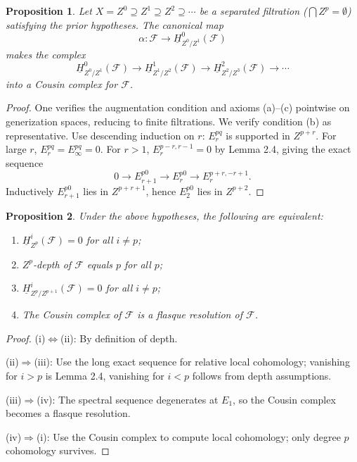 \documentclass[12pt]{book}
\newcommand{\sheaf}[1]{\mathcal{#1}}
\theoremstyle{plain}
\newtheorem{proposition}{Proposition}[section]
\begin{document}
\setcounter{page}{236}
\begin{proposition}
Let \(X=Z^0\supseteq Z^1\supseteq Z^2\supseteq\cdots\) be a separated filtration (\(\bigcap Z^p=\emptyset\)) satisfying the prior hypotheses. The canonical map
\[
\alpha\colon \sheaf{F} \to \underline{H}_{Z^0/Z^1}^0(\sheaf{F})
\]
makes the complex
\[
\underline{H}_{Z^0/Z^1}^0(\sheaf{F})
\to \underline{H}_{Z^1/Z^2}^1(\sheaf{F})
\to \underline{H}_{Z^2/Z^3}^2(\sheaf{F})
\to\cdots
\]
into a Cousin complex for \(\sheaf{F}\).
\end{proposition}

\begin{proof}
One verifies the augmentation condition and axioms (a)--(c) pointwise on generization spaces, reducing to finite filtrations. We verify condition (b) as representative. Use descending induction on \(r\): \(E_r^{pq}\) is supported in \(Z^{p+r}\). For large \(r\), \(E_r^{pq}=E_\infty^{pq}=0\). For \(r>1\), \(E_r^{p-r,r-1}=0\) by Lemma 2.4, giving the exact sequence
\[
0\to E_{r+1}^{p0}\to E_r^{p0}\to E_r^{p+r,-r+1}.
\]
Inductively \(E_{r+1}^{p0}\) lies in \(Z^{p+r+1}\), hence \(E_2^{p0}\) lies in \(Z^{p+2}\).

\setcounter{page}{237}
\end{proof}

\begin{proposition}
Under the above hypotheses, the following are equivalent:
\begin{enumerate}
\item[\textup{(i)}] \(\underline{H}_{Z^p}^i(\sheaf{F})=0\) for all \(i\ne p\);
\item[\textup{(ii)}] \(Z^p\)-depth of \(\sheaf{F}\) equals \(p\) for all \(p\);
\item[\textup{(iii)}] \(\underline{H}_{Z^p/Z^{p+1}}^i(\sheaf{F})=0\) for all \(i\ne p\);
\item[\textup{(iv)}] The Cousin complex of \(\sheaf{F}\) is a flasque resolution of \(\sheaf{F}\).
\end{enumerate}
\end{proposition}

\begin{proof}
(i)\(\Leftrightarrow\)(ii): By definition of depth.

(ii)\(\Rightarrow\)(iii): Use the long exact sequence for relative local cohomology; vanishing for \(i>p\) is Lemma 2.4, vanishing for \(i<p\) follows from depth assumptions.

\setcounter{page}{238}
(iii)\(\Rightarrow\)(iv): The spectral sequence degenerates at \(E_1\), so the Cousin complex becomes a flasque resolution.

(iv)\(\Rightarrow\)(i): Use the Cousin complex to compute local cohomology; only degree \(p\) cohomology survives.
\end{proof}
\end{document}
